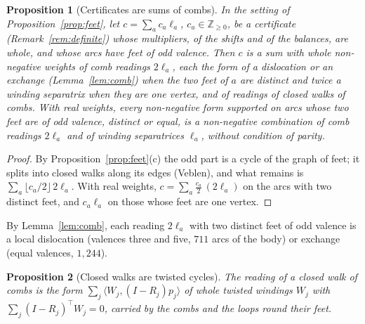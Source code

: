 \documentclass[11pt,a4paper]{article}
\newtheorem{proposition}{Proposition}
\newcommand{\Z}{\mathbb{Z}}
\newcommand{\lean}[1]{\texttt{\detokenize{#1}}}
\newenvironment{evidence}[3][]{}{}
\begin{document}
\begin{evidence}{core}{\lean{Combs.sum_of_combs}, \lean{Combs.veblen}, \lean{Combs.sum_of_combs_real}; the parity from Proposition~\ref{prop:feet}}
\begin{proposition}[Certificates are sums of combs]\label{thm:combs}
In the setting of Proposition~\ref{prop:feet}, let $c = \sum_a c_a\ell_a$,
$c_a \in \Z_{\ge0}$, be a certificate (Remark~\ref{rem:definite}) whose
multipliers, of the shifts and of the balances, are whole, and whose arcs have
feet of odd valence. Then $c$ is a sum with whole non-negative weights of comb
readings $2\ell_a$, each the form of a dislocation or an exchange
(Lemma~\ref{lem:comb}) when the two feet of $a$ are distinct and twice a
winding separatrix when they are one vertex, and of readings of closed walks
of combs. With real
weights, every non-negative form supported on arcs whose two feet are of odd
valence, distinct or equal, is a non-negative combination of comb readings
$2\ell_a$ and of winding separatrices $\ell_a$, without condition of parity.
\end{proposition}
\end{evidence}

\begin{proof}
By Proposition~\ref{prop:feet}(c) the odd part is a cycle of the graph of
feet; it splits into closed walks along its edges (Veblen), and what remains
is $\sum_a \lfloor c_a/2 \rfloor\,2\ell_a$. With real weights, $c = \sum_a
\tfrac{c_a}{2}\,(2\ell_a)$ on the arcs with two distinct feet, and $c_a\ell_a$
on those whose feet are one vertex.
\end{proof}

By Lemma~\ref{lem:comb}, each reading $2\ell_a$ with two distinct feet of odd
valence is a local dislocation (valences three and five, $711$ arcs of the
body) or exchange (equal valences, $1{,}244$).

\begin{evidence}{prose}{proof on paper, not checked on data}
\begin{proposition}[Closed walks are twisted cycles]\label{prop:walks}
The reading of a closed walk of combs is the form $\sum_j \langle W_j, (I -
R_j)p_j\rangle$ of whole twisted windings $W_j$ with $\sum_j (I - R_j)^\top
W_j = 0$, carried by the combs and the loops round their feet.
\end{proposition}
\end{evidence}
\end{document}
